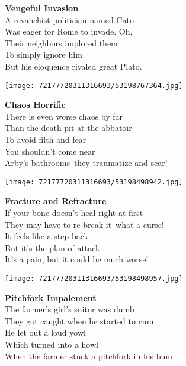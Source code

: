 \documentclass[10pt,letterpaper]{article}
\begin{document}
\begin{center}
\textbf{Vengeful Invasion}\\
\vskip 0.2in
A revanchist politician named Cato\\
Was eager for Rome to invade.  Oh,\\
Their neighbors implored them\\
To simply ignore him\\
But his eloquence rivaled great Plato.\\
\end{center}
\pagebreak

\begin{center}\texttt{[image: 72177720311316693/53198767364.jpg]}
\end{center}
\begin{center}
\textbf{Chaos Horrific}\\
\vskip 0.2in
There is even worse chaos by far\\
Than the death pit at the abbatoir\\
To avoid filth and fear\\
You shouldn't come near\\
Arby's bathrooms--they traumatize and scar!\\
\end{center}
\pagebreak

\begin{center}\texttt{[image: 72177720311316693/53198498942.jpg]}
\end{center}
\begin{center}
\textbf{Fracture and Refracture}\\
\vskip 0.2in
If your bone doesn't heal right at first\\
They may have to re-break it--what a curse!\\
It feels like a step back\\
But it's the plan of attack\\
It's a pain, but it could be much worse!\\
\end{center}
\pagebreak

\begin{center}
\texttt{[image: 72177720311316693/53198498957.jpg]}
\end{center}

\begin{center}
\textbf{Pitchfork Impalement}\\
\vskip 0.2in
The farmer's girl's suitor was dumb\\
They got caught when he started to cum\\
He let out a loud yowl\\
Which turned into a howl\\
When the farmer stuck a pitchfork in his bum\\
\end{center}
\pagebreak
\end{document}
